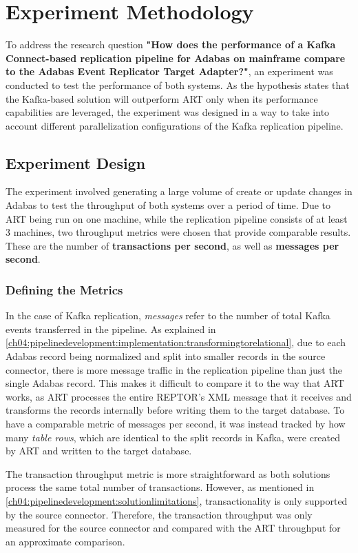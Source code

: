 \chapter{Experiment Methodology}
\label{ch05:methodology}
To address the research question \textbf{"How does the performance of a Kafka Connect-based replication pipeline for Adabas on mainframe compare to the Adabas Event Replicator Target Adapter?"}, an experiment was conducted to test the performance of both systems. As the hypothesis states that the Kafka-based solution will outperform \ac{ART} only when its performance capabilities are leveraged, the experiment was designed in a way to take into account different parallelization configurations of the Kafka replication pipeline.

\section{Experiment Design}
\label{ch05:methodology:design}
The experiment involved generating a large volume of create or update changes in Adabas to test the throughput of both systems over a period of time. Due to \ac{ART} being run on one machine, while the replication pipeline consists of at least 3 machines, two throughput metrics were chosen that provide comparable results. These are the number of \textbf{transactions per second}, as well as \textbf{messages per second}.

\subsection{Defining the Metrics}
In the case of Kafka replication, \textit{messages} refer to the number of total Kafka events transferred in the pipeline. As explained in \ref{ch04:pipelinedevelopment:implementation:transformingtorelational}, due to each Adabas record being normalized and split into smaller records in the source connector, there is more message traffic in the replication pipeline than just the single Adabas record. This makes it difficult to compare it to the way that \ac{ART} works, as \ac{ART} processes the entire \ac{REPTOR}'s XML message that it receives and transforms the records internally before writing them to the target database. To have a comparable metric of messages per second, it was instead tracked by how many \textit{table rows}, which are identical to the split records in Kafka, were created by \ac{ART} and written to the target database.

The transaction throughput metric is more straightforward as both solutions process the same total number of transactions. However, as mentioned in \ref{ch04:pipelinedevelopment:solutionlimitations}, transactionality is only supported by the source connector. Therefore, the transaction throughput was only measured for the source connector and compared with the \ac{ART} throughput for an approximate comparison.

